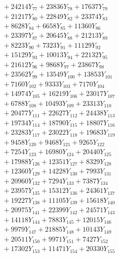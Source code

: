 \documentclass[a4paper,10pt]{article}
\begin{document}
{\begin{align}
&\;  + 24214 Y_{77} + 23836 Y_{78} + 17637 Y_{79} \\[0.3ex]
&\;  + 21217 Y_{80} + 22849 Y_{82} + 23374 Y_{83} \\[0.3ex]
&\;  + 8628 Y_{84} + 6658 Y_{85} + 11360 Y_{86} \\[0.3ex]
&\;  + 23397 Y_{87} + 20645 Y_{88} + 21213 Y_{89} \\[0.5ex]\allowbreak
&\;  + 8223 Y_{90} + 7323 Y_{91} + 11129 Y_{92} \\[0.3ex]
&\;  + 15129 Y_{93} + 10013 Y_{94} + 22132 Y_{95} \\[0.3ex]
&\;  + 21612 Y_{96} + 9868 Y_{97} + 23867 Y_{98} \\[0.3ex]
&\;  + 23562 Y_{99} + 13549 Y_{100} + 13853 Y_{101} \\[0.3ex]
&\;  + 7160 Y_{102} + 9333 Y_{103} + 7170 Y_{104} \\[0.3ex]
&\;  + 14974 Y_{105} + 16219 Y_{106} + 23017 Y_{107} \\[0.3ex]
&\;  + 6788 Y_{108} + 10493 Y_{109} + 23313 Y_{110} \\[0.3ex]
&\;  + 20477 Y_{111} + 22627 Y_{112} + 24438 Y_{113} \\[0.3ex]
&\;  + 19734 Y_{114} + 18790 Y_{115} + 18807 Y_{116} \\[0.3ex]
&\;  + 23283 Y_{117} + 23022 Y_{118} + 19683 Y_{119} \\[0.5ex]\allowbreak
&\;  + 9458 Y_{120} + 9468 Y_{121} + 9265 Y_{122} \\[0.3ex]
&\;  + 7254 Y_{123} + 16980 Y_{124} + 20440 Y_{125} \\[0.3ex]
&\;  + 17988 Y_{126} + 12351 Y_{127} + 8329 Y_{128} \\[0.3ex]
&\;  + 12360 Y_{129} + 14228 Y_{130} + 7993 Y_{131} \\[0.3ex]
&\;  + 20960 Y_{132} + 7294 Y_{133} + 7387 Y_{134} \\[0.3ex]
&\;  + 23957 Y_{135} + 15312 Y_{136} + 24361 Y_{137} \\[0.3ex]
&\;  + 19227 Y_{138} + 11105 Y_{139} + 15618 Y_{140} \\[0.3ex]
&\;  + 20975 Y_{141} + 22399 Y_{142} + 24571 Y_{143} \\[0.3ex]
&\;  + 14118 Y_{144} + 7883 Y_{145} + 12015 Y_{146} \\[0.3ex]
&\;  + 9979 Y_{147} + 21885 Y_{148} + 10143 Y_{149} \\[0.5ex]\allowbreak
&\;  + 20511 Y_{150} + 9971 Y_{151} + 7427 Y_{152} \\[0.3ex]
&\;  + 17302 Y_{153} + 11471 Y_{154} + 20330 Y_{155} \\[0.3ex]

\end{align}}
\end{document}
